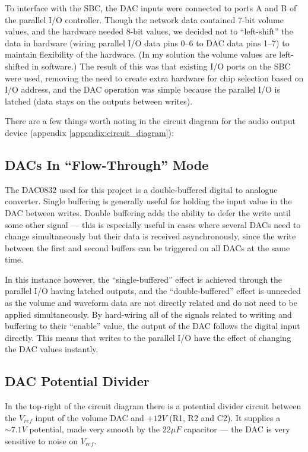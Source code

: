 To interface with the SBC, the DAC inputs were connected to ports A and B of the parallel I/O 
controller.  Though the network data contained 7-bit volume values, and the hardware needed 8-bit 
values, we decided not to ``left-shift'' the data in hardware (wiring parallel I/O data pins 0--6 to 
DAC data pins 1--7) to maintain flexibility of the hardware.  (In my solution the volume values are 
left-shifted in software.)  The result of this was that existing I/O ports on the SBC were used, 
removing the need to create extra hardware for chip selection based on I/O address, and the DAC 
operation was simple because the parallel I/O is latched (data stays on the outputs between writes).

There are a few things worth noting in the circuit diagram for the audio output device (appendix 
\ref{appendix:circuit_diagram}):

\subsection{DACs In ``Flow-Through'' Mode}

The DAC0832 used for this project is a double-buffered digital to analogue converter.  Single 
buffering is generally useful for holding the input value in the DAC between writes.  Double 
buffering adds the ability to defer the write until some other signal --- this is especially useful 
in cases where several DACs need to change simultaneously but their data is received asynchronously, 
since the write between the first and second buffers can be triggered on all DACs at the same time.

In this instance however, the ``single-buffered'' effect is achieved through the parallel I/O having 
latched outputs, and the ``double-buffered'' effect is unneeded as the volume and waveform data are 
not directly related and do not need to be applied simultaneously.  By hard-wiring all of the 
signals related to writing and buffering to their ``enable'' value, the output of the DAC follows 
the digital input directly.  This means that writes to the parallel I/O have the effect of changing 
the DAC values instantly.

\subsection{DAC Potential Divider}

In the top-right of the circuit diagram there is a potential divider circuit between the $V_{ref}$ 
input of the volume DAC and $+12V$ (R1, R2 and C2).  It supplies a $\sim7.1V$ potential, made very 
smooth by the $22\mu{}F$ capacitor --- the DAC is very sensitive to noise on $V_{ref}$.

